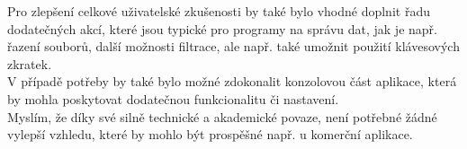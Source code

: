   			Pro zlepšení celkové uživatelské zkušenosti by také bylo vhodné doplnit řadu dodatečných akcí, které jsou typické pro programy na správu dat, jak je např. řazení souborů, další možnosti filtrace, ale např. také umožnit použití klávesových zkratek.\\
  			
  			V případě potřeby by také bylo možné zdokonalit konzolovou část aplikace, která by mohla poskytovat dodatečnou funkcionalitu či nastavení.\\
  			
  			Myslím, že díky své silně technické a akademické povaze, není potřebné žádné vylepší vzhledu, které by mohlo být prospěšné např. u komerční aplikace.